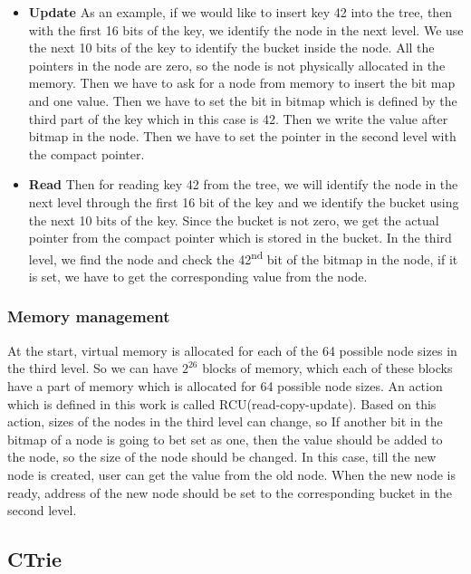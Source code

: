 \documentclass[12pt]{report}
\begin{document}
\begin{itemize}

\item \textbf{Update} As an example, if we would like to insert key 42 into the tree, then with the first 16 bits of the key, we identify the node in the next level. We use the next 10 bits of the key to identify the bucket inside the node. All the pointers in the node are zero, so the node is not physically allocated in the memory. Then we have to ask for a node from memory to insert the bit map and one value. Then we have to set the bit in bitmap which is defined by the third part of the key which in this case is 42. Then we write the value after bitmap in the node. Then we have to set the pointer in the second level with the compact pointer. 

\item \textbf{Read} Then for reading key 42 from the tree, we will identify the node in the next level through the first 16 bit of the key and we identify the bucket using the next 10 bits of the key. Since the bucket is not zero, we get the actual pointer from the compact pointer which is stored in the bucket. In the third level, we find the node and check the 42\textsuperscript{nd} bit of the bitmap in the node, if it is set, we have to get the corresponding value from the node.

\end{itemize}

\subsubsection{Memory management}

At the start, virtual memory is allocated for each of the 64 possible node sizes in the third level. So we can have ${2}^{26}$ blocks of memory, which each of these blocks have a part of memory which is allocated for 64 possible node sizes. An action which is defined in this work is called RCU(read-copy-update). Based on this action, sizes of the nodes in the third level can change, so If another bit in the bitmap of a node is going to bet set as one, then the value should be added to the node, so the size of the node should be changed. In this case, till the new node is created, user can get the value from the old node. When the new node is ready, address of the new node should be set to the corresponding bucket in the second level.    


\subsection{CTrie\cite{ctrie}}
\end{document}
